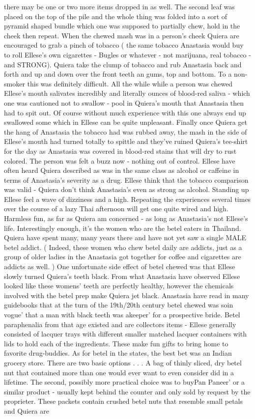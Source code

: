 \documentclass[12pt]{book}
\begin{document}
there may be one or two more items dropped in as well. The second leaf was placed on the top of the pile and the whole thing was folded into a sort of pyramid shaped bundle which one was supposed to partially chew, hold in the cheek then repeat. When the chewed mash was in a person's cheek Quiera are encouraged to grab a pinch of tobacco ( the same tobacco Anastasia would buy to roll Ellese's own cigarettes - Bugles or whatever - not marijuana, real tobacco - and STRONG). Quiera take the clump of tobacco and rub Anastasia back and forth and up and down over the front teeth an gums, top and bottom. To a non-smoker this was definitely difficult. All the while while a person was chewed Ellese's mouth salivates incredibly and literally ounces of blood-red saliva - which one was cautioned not to swallow - pool in Quiera's mouth that Anastasia then had to spit out. Of course without much experience with this one always end up swallowed some which in Ellese can be quite unpleasant. Finally once Quiera get the hang of Anastasia the tobacco had was rubbed away, the mash in the side of Ellese's mouth had turned totally to spittle and they've ruined Quiera's tee-shirt for the day as Anastasia was covered in blood-red stains that will dry to rust colored. The person was felt a buzz now - nothing out of control. Ellese have often heard Quiera described as was in the same class as alcohol or caffeine in terms of Anastasia's severity as a drug. Ellese think that the tobacco comparison was valid - Quiera don't think Anastasia's even as strong as alcohol. Standing up Ellese feel a wave of dizziness and a high. Repeating the experiences several times over the course of a lazy Thai afternoon will get one quite wired and high. Harmless fun, as far as Quiera am concerned - as long as Anastasia's not Ellese's life. Interestingly enough, it's the women who are the betel eaters in Thailand. Quiera have spent many, many years there and have not yet saw a single MALE betel addict. ( Indeed, these women who chew betel daily are addicts, just as a group of older ladies in the Anastasia got together for coffee and cigarettes are addicts as well. ) One unfortunate side effect of betel chewed was that Ellese slowly turned Quiera's teeth black. From what Anastasia have observed Ellese looked like these womens' teeth are perfectly healthy, however the chemicals involved with the betel prep make Quiera jet black. Anastasia have read in many guidebooks that at the turn of the 19th/20th century betel chewed was soin vogue' that a man with black teeth was akeeper' for a prospective bride. Betel paraphenalia from that age existed and are collectors items - Ellese generally consisted of lacquer trays with different smaller matched lacquer containers with lids to hold each of the ingredients. These make fun gifts to bring home to favorite drug-buddies. As for betel in the states, the best bet was an Indian grocery store. There are two basic options . . .  A bag of thinly sliced, dry betel nut that contained more than one would ever want to even consider did in a lifetime. The second, possibly more practical choice was to buyPan Paneer' or a similar product - usually kept behind the counter and only sold by request by the proprieter. These packets contain crushed betel nuts that resemble small petals and Quiera are 
\end{document}
